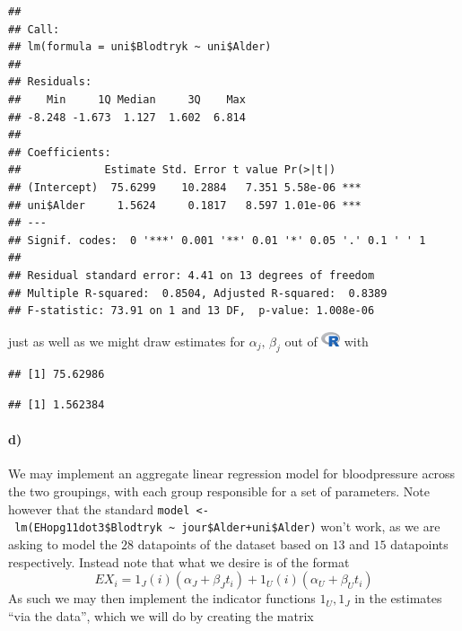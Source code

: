 \documentclass[
]{article}
\newenvironment{Shaded}{\begin{snugshade}}{\end{snugshade}}
\newcommand{\DecValTok}[1]{\textcolor[rgb]{0.00,0.00,0.81}{#1}}
\newcommand{\NormalTok}[1]{#1}
\newcommand{\OperatorTok}[1]{\textcolor[rgb]{0.81,0.36,0.00}{\textbf{#1}}}
\newcommand{\StringTok}[1]{\textcolor[rgb]{0.31,0.60,0.02}{#1}}
\begin{document}
\begin{verbatim}
## 
## Call:
## lm(formula = uni$Blodtryk ~ uni$Alder)
## 
## Residuals:
##    Min     1Q Median     3Q    Max 
## -8.248 -1.673  1.127  1.602  6.814 
## 
## Coefficients:
##             Estimate Std. Error t value Pr(>|t|)    
## (Intercept)  75.6299    10.2884   7.351 5.58e-06 ***
## uni$Alder     1.5624     0.1817   8.597 1.01e-06 ***
## ---
## Signif. codes:  0 '***' 0.001 '**' 0.01 '*' 0.05 '.' 0.1 ' ' 1
## 
## Residual standard error: 4.41 on 13 degrees of freedom
## Multiple R-squared:  0.8504, Adjusted R-squared:  0.8389 
## F-statistic: 73.91 on 1 and 13 DF,  p-value: 1.008e-06
\end{verbatim}

just as well as we might draw estimates for \(\alpha_{j},\,\beta_j\) out
of \includegraphics[width=\textwidth,height=0.16667in]{R_logo.png} with

\begin{Shaded}
\end{Shaded}

\begin{verbatim}
## [1] 75.62986
\end{verbatim}

\begin{Shaded}
\end{Shaded}

\begin{verbatim}
## [1] 1.562384
\end{verbatim}

\hypertarget{d-1}{%
\paragraph{\texorpdfstring{\textbf{d)}}{d)}}\label{d-1}}

We may implement an aggregate linear regression model for bloodpressure
across the two groupings, with each group responsible for a set of
parameters. Note however that the standard
\texttt{model\ \textless{}-\ lm(EHopg11dot3\$Blodtryk\ \textasciitilde{}\ jour\$Alder+uni\$Alder)}
won't work, as we are asking to model the \(28\) datapoints of the
dataset based on \(13\) and \(15\) datapoints respectively. Instead note
that what we desire is of the format \[
EX_i=1_J(i)\left({\alpha_J+\beta_Jt_i}\right)+1_U(i)\left({\alpha_U+\beta_Ut_i}\right)
\] As such we may then implement the indicator functions \(1_U,1_J\) in
the estimates ``via the data'', which we will do by creating the matrix
\end{document}
